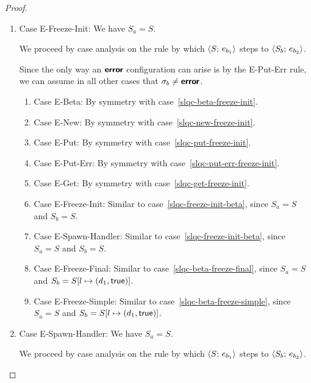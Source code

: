 \begin{proof}
\begin{enumerate}
  \item Case {\sc E-Freeze-Init}: We have $S_a = S$.

    We proceed by case analysis on the rule by which
    $\langle S;\, e_{b_1} \rangle$ steps to $\langle S_b;\, e_{b_2} \rangle$.

    Since the only way an $\textbf{\textsf{error}}$ configuration can arise is by the
    {\sc E-Put-Err} rule, we can assume in all other cases that
    $\sigma_b \neq \textbf{\textsf{error}}$.
    \begin{enumerate}
    \item \label{slqc-freeze-init-beta}Case {\sc E-Beta}: By symmetry with case~\ref{slqc-beta-freeze-init}.
    \item \label{slqc-freeze-init-new}Case {\sc E-New}: By symmetry with case~\ref{slqc-new-freeze-init}.
    \item \label{slqc-freeze-init-put}Case {\sc E-Put}: By symmetry with case~\ref{slqc-put-freeze-init}.
    \item \label{slqc-freeze-init-put-err}Case {\sc E-Put-Err}: By symmetry with case~\ref{slqc-put-err-freeze-init}.
    \item \label{slqc-freeze-init-get}Case {\sc E-Get}: By symmetry with case~\ref{slqc-get-freeze-init}.
    \item \label{slqc-freeze-init-freeze-init}Case {\sc
      E-Freeze-Init}: Similar to case~\ref{slqc-freeze-init-beta},
      since $S_a = S$ and $S_b = S$.
    \item \label{slqc-freeze-init-spawn-handler}Case {\sc
      E-Spawn-Handler}: Similar to case~\ref{slqc-freeze-init-beta},
      since $S_a = S$ and $S_b = S$.
    \item \label{slqc-freeze-init-freeze-final}Case {\sc
      E-Freeze-Final}: Similar to case~\ref{slqc-beta-freeze-final},
      since $S_a = S$ and $S_b = S[l \mapsto (d_1, \textsf{true})]$.
    \item \label{slqc-freeze-init-freeze-simple}Case {\sc
      E-Freeze-Simple}: Similar to case~\ref{slqc-beta-freeze-simple},
      since $S_a = S$ and $S_b = S[l \mapsto (d_1, \textsf{true})]$.
    \end{enumerate}

  \item Case {\sc E-Spawn-Handler}: We have $S_a = S$.

    We proceed by case analysis on the rule by which
    $\langle S;\, e_{b_1} \rangle$ steps to $\langle S_b;\, e_{b_2} \rangle$.


\end{enumerate}
\end{proof}
